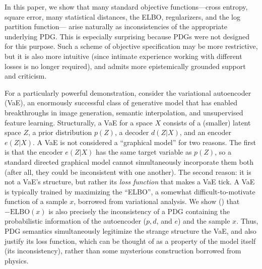 \documentclass[twoside]{article}
\theoremstyle{plain}
\theoremstyle{definition}
\begin{document}
In this paper, we show that many standard objective functions---cross entropy, square error, many statistical distances, the ELBO, regularizers, and the log partition function---
arise naturally as inconsistencies of the appropriate underlying PDG.
This is especially surprising because PDGs were not designed for this purpose.
Such a scheme of objective specification may be more restrictive, but it is also more intuitive (since intimate experience working with different losses is no longer required), and admits more epistemically grounded support and criticism.



For a particularly powerful demonstration, consider the variational autoencoder (VaE), an enormously successful class of generative model that has enabled breakthroughs in image generation, semantic interpolation, and unsupervised feature learning.
Structurally, a VaE for a space $X$ consists of a (smaller) latent space $Z$, a prior distribution $p(Z)$, a decoder $d(Z | X)$, and an encoder $e(Z| X)$.
A VaE is not considered a ``graphical model'' for two reasons.
The first is that the encoder $e(Z|X)$ has the same target variable as $p(Z)$, so a standard directed graphical model cannot simultaneously incorporate them both (after all, they could be inconsistent with one another).
The second reason: it is not a VaE's structure, but rather its \emph{loss function} that makes a VaE tick. A VaE is typically trained by 
maximizing the ``ELBO'', 
    a somewhat difficult-to-motivate function of a sample $x$, borrowed from variational analysis.
We show () that $-\mathrm{ELBO}(x)$ is also precisely the inconsistency of a PDG containing the probabilistic information of the autoencoder ($p, d$, and $e$) and the sample $x$.
Thus, PDG semantics simultaneously legitimize the strange structure the VaE, and also justify its loss function, which can be thought of as a property of the model itself (its inconsistency), rather than some mysterious construction borrowed from physics.
\end{document}
